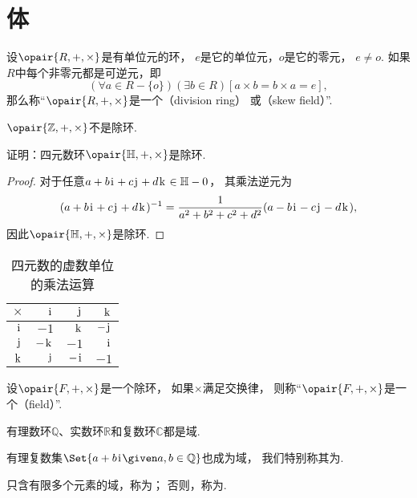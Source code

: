 \section{体}
\begin{definition}
设\(\opair{R,+,\times}\)是有单位元的环，
\(e\)是它的单位元，\(o\)是它的零元，
\(e \neq o\).
如果\(R\)中每个非零元都是可逆元，即\[
	(\forall a \in R-\{o\})(\exists b \in R)[a \times b = b \times a = e],
\]
那么称“\(\opair{R,+,\times}\)是一个（division ring）
或（skew field）”.
\end{definition}

\(\opair{\mathbb{Z},+,\times}\)不是除环.

\begin{example}
证明：四元数环\(\opair{\mathbb{H},+,\times}\)是除环.
\begin{proof}
对于任意\(a+b\kern1pt\mathrm{i}\kern1pt+c\kern1pt\mathrm{j}\kern1pt+d\kern1pt\mathrm{k}\kern1pt\in\mathbb{H}-0\)，
其乘法逆元为\[
	(a+b\kern1pt\mathrm{i}\kern1pt+c\kern1pt\mathrm{j}\kern1pt+d\kern1pt\mathrm{k}\kern1pt)^{-1}
	= \frac1{a^2+b^2+c^2+d^2} (a-b\kern1pt\mathrm{i}\kern1pt-c\kern1pt\mathrm{j}\kern1pt-d\kern1pt\mathrm{k}\kern1pt),
\]
因此\(\opair{\mathbb{H},+,\times}\)是除环.
\end{proof}
\end{example}

\begin{table}[hbt]
	\centering
	\begin{tabular}{r|*3r}
		\(\times\) & \(\kern1pt\mathrm{i}\kern1pt\) & \(\kern1pt\mathrm{j}\kern1pt\) & \(\kern1pt\mathrm{k}\kern1pt\) \\ \hline
		\(\kern1pt\mathrm{i}\kern1pt\) & \(-1\) & \(\kern1pt\mathrm{k}\kern1pt\) & \(-\kern1pt\mathrm{j}\kern1pt\) \\
		\(\kern1pt\mathrm{j}\kern1pt\) & \(-\kern1pt\mathrm{k}\kern1pt\) & \(-1\) & \(\kern1pt\mathrm{i}\kern1pt\) \\
		\(\kern1pt\mathrm{k}\kern1pt\) & \(\kern1pt\mathrm{j}\kern1pt\) & \(-\kern1pt\mathrm{i}\kern1pt\) & \(-1\) \\
	\end{tabular}
	\caption{四元数的虚数单位的乘法运算}
\end{table}

\begin{definition}
设\(\opair{F,+,\times}\)是一个除环，
如果\(\times\)满足交换律，
则称“\(\opair{F,+,\times}\)是一个（field）”.
\end{definition}

有理数环\(\mathbb{Q}\)、实数环\(\mathbb{R}\)和复数环\(\mathbb{C}\)都是域.

有理复数集\(\Set{ a+b\iu \given a,b\in\mathbb{Q} }\)也成为域，
我们特别称其为.

只含有限多个元素的域，称为；
否则，称为.
